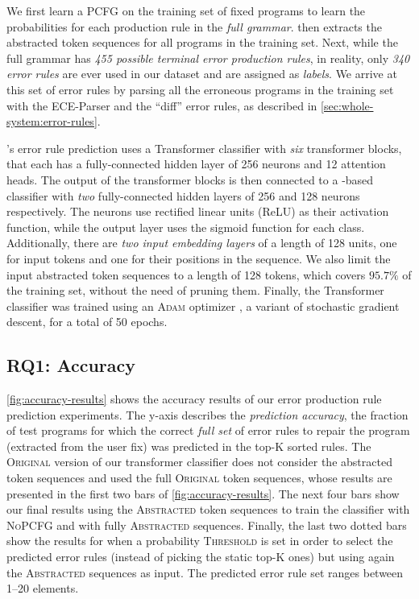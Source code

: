 We first learn a PCFG on the training set of fixed programs to learn the
probabilities for each production rule in the \emph{full \python grammar}.
\toolname then extracts the abstracted token sequences for all programs in the
training set. Next, while the full \python grammar has \emph{455 possible
terminal error production rules}, in reality, only \emph{340 error rules} are
ever used in our dataset and are assigned as \emph{labels}. We arrive at this
set of error rules by parsing all the erroneous programs in the training set
with the ECE-Parser and the ``diff'' error rules, as described in
\autoref{sec:whole-system:error-rules}.

\toolname's error rule prediction uses a Transformer classifier with \emph{six}
transformer blocks, that each has a fully-connected hidden layer of 256 neurons
and 12 attention heads. The output of the transformer blocks is then connected
to a \dnn-based classifier with \emph{two} fully-connected hidden layers of 256
and 128 neurons respectively. The neurons use rectified linear units (ReLU) as
their activation function, while the output layer uses the sigmoid function for
each class. Additionally, there are \emph{two input embedding layers} of a
length of 128 units, one for input tokens and one for their positions in the
sequence. We also limit the input abstracted token sequences to a length of 128
tokens, which covers $95.7\%$ of the training set, without the need of pruning
them. Finally, the Transformer classifier was trained using an \textsc{Adam}
optimizer \citep{Kingma2014-ng}, a variant of stochastic gradient descent, for a
total of 50 epochs.

\subsection{RQ1: Accuracy}
\label{sec:eval:accuracy}



\autoref{fig:accuracy-results} shows the accuracy results of our error
production rule prediction experiments. The y-axis describes the
\emph{prediction accuracy}, \ie the fraction of test programs for which the
correct \emph{full set} of error rules to repair the program (extracted from
the user fix) was predicted in the top-K sorted rules.
%
The \textsc{Original} version of our transformer classifier does not consider
the abstracted token sequences and used the full \textsc{Original} token
sequences, whose results are presented in the first two bars of
\autoref{fig:accuracy-results}. The next four bars show our final results using
the \textsc{Abstracted} token sequences to train the classifier with
\textsc{NoPCFG} and with fully \textsc{Abstracted} sequences. Finally, the last
two dotted bars show the results for when a probability \textsc{Threshold} is
set in order to select the predicted error rules (instead of picking the static
top-K ones) but using again the \textsc{Abstracted} sequences as input. The
predicted error rule set ranges between 1--20 elements.

